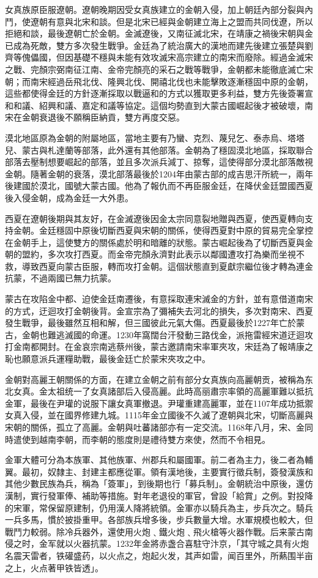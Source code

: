 女真族原臣服遼朝。遼朝晚期因受女真族建立的金朝入侵，加上朝廷內部分裂與內鬥，使遼朝有意與北宋和談。但是北宋已經與金朝建立海上之盟而共同伐遼，所以拒絕和談，最後遼朝亡於金朝。金滅遼後，又南征滅北宋，在靖康之禍後宋朝與金已成為死敵，雙方多次發生戰爭。金廷為了統治廣大的漢地而建先後建立張楚與劉齊等傀儡國，但因基礎不穩與未能有效攻滅宋高宗建立的南宋而廢除。經過金滅宋之戰、完顏宗弼南征江南、金帝完顏亮的采石之戰等戰爭，金朝都未能徹底滅亡宋朝；而南宋經過岳飛北伐、隆興北伐、開禧北伐也未能擊敗逐漸穩固中原的金朝，這些都使得金廷的方針逐漸採取以戰逼和的方式以獲取更多利益，雙方先後簽署宣和和議、紹興和議、嘉定和議等協定。這個均勢直到大蒙古國崛起後才被破壞，南宋在金朝衰退後不願稱臣納貢，雙方再度交惡。

漠北地區原為金朝的附屬地區，當地主要有乃蠻、克烈、蔑兒乞、泰赤烏、塔塔兒、蒙古與札達蘭等部落，此外還有其他部落。金朝為了穩固漠北地區，採取聯合部落去壓制想要崛起的部落，並且多次派兵減丁、掠奪，這使得部分漠北部落敵視金朝。隨著金朝的衰落，漠北部落最後於1204年由蒙古部的成吉思汗所統一，兩年後建國於漠北，國號大蒙古國。他為了報仇而不再臣服金廷，在降伏金廷盟國西夏後入侵金朝，成為金廷一大外患。

西夏在遼朝後期與其友好，在金滅遼後因金太宗同意裂地贈與西夏，使西夏轉向支持金朝。金廷穩固中原後切斷西夏與宋朝的關係，使得西夏對中原的貿易完全掌控在金朝手上，這使雙方的關係處於明和暗離的狀態。蒙古崛起後為了切斷西夏與金朝的盟約，多次攻打西夏。而金帝完顏永濟對此表示以鄰國遭攻打為樂而坐視不救，導致西夏向蒙古臣服，轉而攻打金朝。這個狀態直到夏獻宗繼位後才轉為連金抗蒙，不過兩國已無力抗蒙。

蒙古在攻陷金中都、迫使金廷南遷後，有意採取連宋滅金的方針，並有意借道南宋的方式，迂迴攻打金朝後背。金宣宗為了彌補失去河北的損失，多次對南宋、西夏發生戰爭，最後雖然互相和解，但三國彼此元氣大傷。西夏最後於1227年亡於蒙古，金朝也難逃滅國的命運。1230年窩闊台汗發動三路伐金，派拖雷經宋道迂迴攻打金南都開封。在金哀宗南逃蔡州後，蒙古邀請南宋率軍夾攻，宋廷為了報靖康之恥也願意派兵運糧助戰，最後金廷亡於蒙宋夾攻之中。

金朝對高麗王朝關係的方面，在建立金朝之前有部分女真族向高麗朝贡，被稱為东北女真。金太祖统一了女真諸部后入侵高麗。此時高丽肅宗率領的高麗軍難以抵抗金軍，最後在尹瓘的说服下讓女真軍撤退。尹瓘重建高麗軍，並在1107年成功抵禦女真入侵，並在國界修建九城。1115年金立國後不久滅了遼朝與北宋，切斷高麗與宋朝的關係，孤立了高麗。金朝與吐蕃諸部亦有一定交流。1168年八月，宋、金同時遣使到越南李朝，而李朝的態度則是禮待雙方來使，然而不令相見。

金軍大體可分為本族軍、其他族軍、州郡兵和屬國軍。前二者為主力，後二者為輔翼。最初，奴隸主、封建主都應從軍。領有漢地後，主要實行徵兵制，簽發漢族和其他少數民族為兵，稱為「簽軍」，到後期也行「募兵制」。金朝統治中原後，還仿漢制，實行發軍俸、補助等措施。對年老退役的軍官，曾設「給賞」之例。對投降的宋軍，常保留原建制，仍用漢人降將統領。金軍亦以騎兵為主，步兵次之。騎兵一兵多馬，慣於披掛重甲。各部族兵增多後，步兵數量大增。水軍規模也較大，但戰鬥力較弱。除冷兵器外，還使用火炮﹑鐵火炮﹑飛火槍等火器作戰。后来蒙古南侵之时，金军就以火器抗蒙。1232年金將赤盏合喜駐守汴京，「其守城之具有火炮名震天雷者，铁礶盛药，以火点之，炮起火发，其声如雷，闻百里外，所爇围半亩之上，火点著甲铁皆透」。

